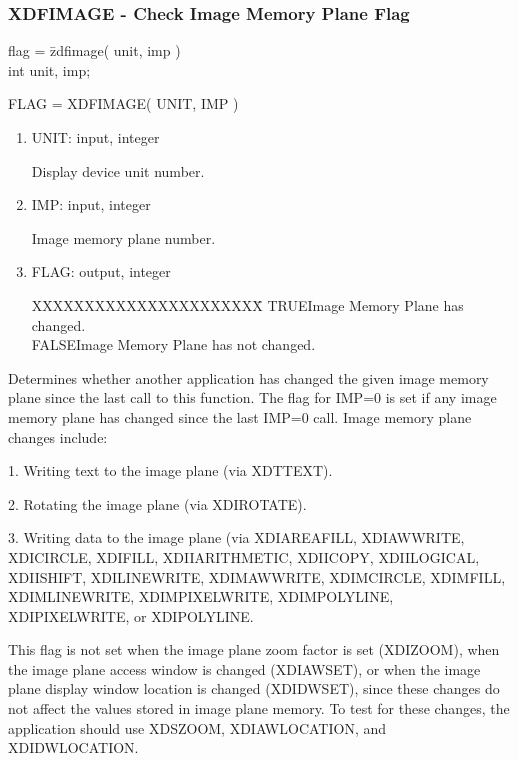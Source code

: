 \subsubsection{XDFIMAGE - Check Image Memory Plane Flag}
\begin{tabbing}
flag = \=zdfimage( unit, imp )\\
\>int  unit, imp;\\
\end{tabbing}
FLAG = XDFIMAGE( UNIT, IMP )
\begin{enumerate}
\item UNIT:  input, integer

Display device unit number.
\item IMP:  input, integer

Image memory plane number.
\item FLAG:  output, integer
\begin{tabbing}
XXXXXXXXXXXXXXXXXXXXXX\=\kill
TRUE\>Image Memory Plane has changed.\\
FALSE\>Image Memory Plane has not changed.\\
\end{tabbing}
\end{enumerate}
Determines whether another application has changed the given image memory
plane since the last call to this function.  The flag for IMP=0 is set
if any image memory plane has changed since the last IMP=0 call.  Image
memory plane changes include:

1.  Writing text to the image plane (via XDTTEXT).

2.  Rotating the image plane (via XDIROTATE).

3.  Writing data to the image plane (via XDIAREAFILL, XDIAWWRITE,
XDICIRCLE, XDIFILL, XDIIARITHMETIC, XDIICOPY, XDIILOGICAL,
XDIISHIFT, XDILINEWRITE, XDIMAWWRITE, XDIMCIRCLE, XDIMFILL,
XDIMLINEWRITE, XDIMPIXELWRITE, XDIMPOLYLINE, XDIPIXELWRITE, or
XDIPOLYLINE.

This flag is not set when the image plane zoom factor is set
(XDIZOOM), when the image plane access window is changed (XDIAWSET),
or when the image plane display window location is changed (XDIDWSET),
since these changes do not affect the values stored in image plane
memory.  To test for these changes, the application should use
XDSZOOM, XDIAWLOCATION, and XDIDWLOCATION.
\newpage
